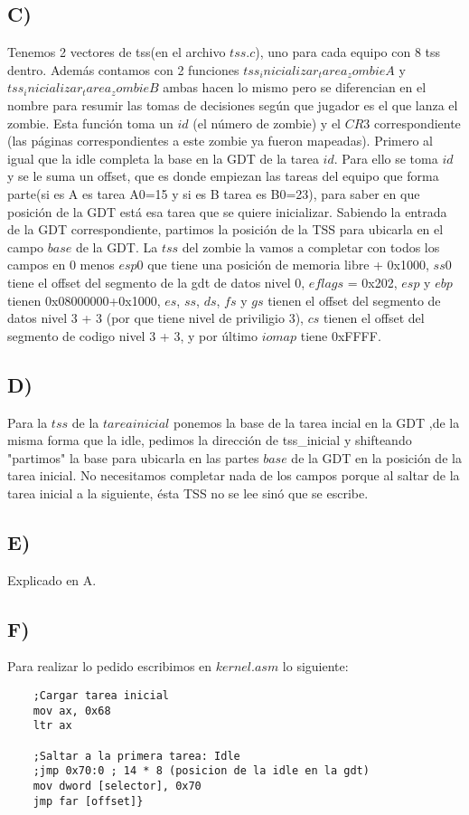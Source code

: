 \subsection*{C)}
Tenemos 2 vectores de tss(en el archivo $tss.c$), uno para cada equipo con 8 tss dentro.
Además contamos con 2 funciones $tss_inicializar_tarea_zombieA$ y $tss_inicializar_tarea_zombieB$ ambas hacen lo mismo pero se diferencian en el nombre para resumir las tomas de decisiones
seg\'un que jugador es el que lanza el zombie.
Esta función toma un $id$ (el número de zombie) y el $CR3$ correspondiente (las p\'aginas correspondientes a este zombie ya fueron mapeadas). 
Primero al igual que la idle completa la base en la GDT de la tarea $id$. Para ello se toma $id$ y se le suma un offset, que es donde empiezan las tareas del equipo que forma parte(si es A es tarea A0=15 y si es B tarea es B0=23), para saber en que posición de la GDT está esa tarea que se quiere inicializar. Sabiendo la entrada de la GDT correspondiente, partimos la posici\'on de la TSS para ubicarla en el campo
$base$ de la GDT. \newline
La $tss$ del zombie la vamos a completar con todos los campos en 0 menos $esp0$ que tiene una posición de memoria libre + 0x1000, $ss0$ tiene el offset del segmento de la gdt 
de datos nivel 0, $eflags$ = 0x202, $esp$ y $ebp$ tienen 0x08000000+0x1000, $es$, $ss$, $ds$, $fs$ y $gs$ tienen el offset del segmento de datos nivel 3 + 3 (por que tiene 
nivel de priviligio 3), $cs$ tienen el offset del segmento de codigo nivel 3 + 3, y por último $iomap$ tiene 0xFFFF.

\subsection*{D)}
Para la $tss$ de la $tarea inicial$  ponemos la base de la tarea incial en la GDT ,de la misma forma que la idle, pedimos la direcci\'on de tss\_inicial y shifteando "partimos" 
la base para ubicarla en las partes $base$ de la GDT en la posici\'on de la tarea inicial.\newline
No necesitamos completar nada de los campos porque al saltar de la tarea inicial a la siguiente, \'esta TSS no se lee sin\'o que se escribe.

\subsection*{E)}
Explicado en A.


\subsection*{F)}
Para realizar lo pedido escribimos en $kernel.asm$ lo siguiente:
\begin{codesnippet}
\begin{verbatim}
   	;Cargar tarea inicial
    mov ax, 0x68
    ltr ax
    
    ;Saltar a la primera tarea: Idle
    ;jmp 0x70:0 ; 14 * 8 (posicion de la idle en la gdt)
    mov dword [selector], 0x70
    jmp far [offset]}
\end{verbatim}
\end{codesnippet}
